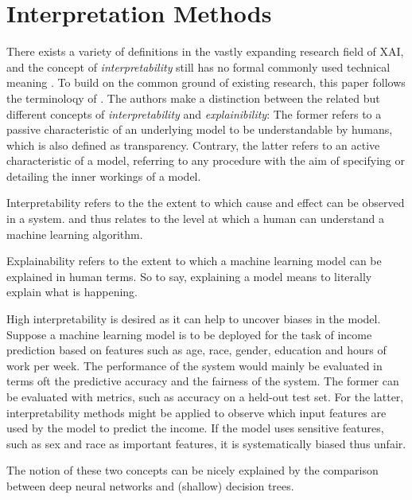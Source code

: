 \section{Interpretation Methods}
\label{sec:interpretation_methods}

There exists a variety of definitions in the vastly expanding research field of XAI, and the concept of \textit{interpretability} still has no formal commonly used technical meaning \cite{lipton2018mythos}. To build on the common ground of existing research, this paper follows the terminoloqy of \cite{arrieta2020explainable}.
The authors make a distinction between the related but different concepts of \textit{interpretability} and \textit{explainibility}: The former refers to a passive characteristic of an underlying model to be understandable by humans, which is also defined as transparency. Contrary, the latter refers to an active characteristic of a model, referring to any procedure with the aim of specifying or detailing the inner workings of a model. 

Interpretability refers to the the extent to which cause and effect can be observed in a system.   
and thus relates to the level at which a human can understand a machine learning algorithm.

Explainability refers to the extent to which a machine learning model can be explained in human terms. So to say, explaining a model means to literally explain what is happening. 

High interpretability is desired as it can help 
to uncover biases in the model. Suppose a machine learning model is to be deployed for the task of income prediction based on features such as age, race, gender, education and hours of work per week. The performance of the system would mainly be evaluated in terms oft the predictive accuracy and the fairness of the system. The former can be evaluated with metrics, such as accuracy on a held-out test set. For the latter, interpretability methods might be applied to observe which input features are used by the model to predict the income. 
If the model uses sensitive features, such as sex and race as important features, it is systematically biased thus unfair. 

The notion of these two concepts can be nicely explained by the comparison between deep neural networks and (shallow) decision trees. 


